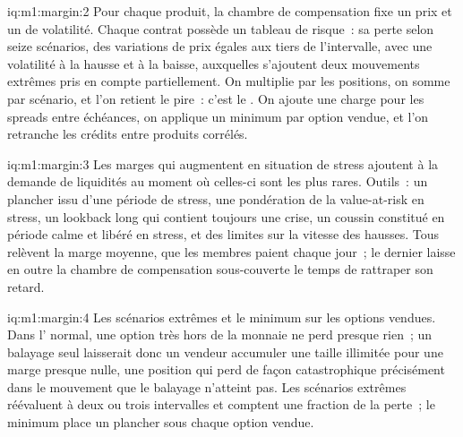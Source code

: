 \begin{solution}{iq:m1:margin:2}
Pour chaque produit, la chambre de compensation fixe un prix et un  de volatilité.
Chaque contrat possède un tableau de risque~: sa perte selon seize scénarios, des variations de prix
égales aux tiers de l'intervalle, avec une volatilité à la hausse et à la baisse, auxquelles s'ajoutent
deux mouvements extrêmes pris en compte partiellement. On multiplie par les positions, on somme par scénario,
et l'on retient le pire~: c'est le . On ajoute une charge pour les spreads entre échéances,
on applique un minimum par option vendue, et l'on retranche les crédits entre produits corrélés.
\end{solution}

\begin{solution}{iq:m1:margin:3}
Les marges qui augmentent en situation de stress ajoutent à la demande de liquidités au
moment où celles-ci sont les plus rares. Outils~: un plancher issu d'une période de stress,
une pondération de la value-at-risk en stress, un lookback long qui contient toujours une crise,
un coussin constitué en période calme et libéré en stress, et des limites sur la vitesse des
hausses. Tous relèvent la marge moyenne, que les membres paient chaque jour~; le dernier laisse
en outre la chambre de compensation sous-couverte le temps de rattraper son retard.
\end{solution}

\begin{solution}{iq:m1:margin:4}
Les scénarios extrêmes et le minimum sur les options vendues. Dans l'
normal, une option très hors de la monnaie ne perd presque rien~; un balayage seul laisserait
donc un vendeur accumuler une taille illimitée pour une marge presque nulle,
une position qui perd de façon catastrophique précisément dans le mouvement que le balayage
n'atteint pas. Les scénarios extrêmes réévaluent à deux ou trois intervalles et comptent
une fraction de la perte~; le minimum place un plancher sous chaque option vendue.
\end{solution}

